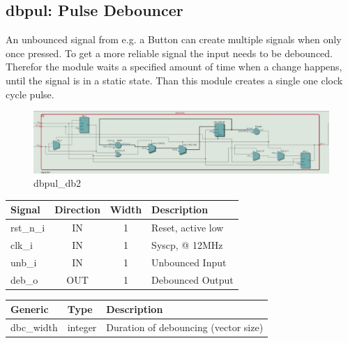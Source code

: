 \documentclass[12pt,a4 paper] {report}
\begin{document}
\newpage

\subsection{dbpul: Pulse Debouncer}
An unbounced signal from e.g. a Button can create multiple signals when only once pressed. To get a more reliable signal 
the input needs to be debounced. Therefor the module waits a specified amount of time when a change happens, until the 
signal is in a static state. Than this module creates a single one clock cycle pulse.
\begin{figure}[h]
	\centering	
	\includegraphics[scale=0.3]{../png/dbpul_db2.png}
	\caption{dbpul\_db2}
\end{figure}
\begin{center}
	\begin{tabular}{ | p{2cm} | c | c | p{5cm} |}
		\hline
		\textbf{Signal} & \textbf{Direction} & \textbf{Width} & \textbf{Description} \\
		\hline	
  	rst\_n\_i & IN & 1 &  Reset, active low \\
  	\hline
		clk\_i & IN & 1 & Syscp, @ 12MHz \\
		\hline
		unb\_i & IN & 1 & Unbounced Input \\
		\hline
		deb\_o & OUT & 1 & Debounced Output \\
		\hline
	\end{tabular}
\end{center}
\begin{center}
	\begin{tabular}{| p{2cm} | p{2cm} | p{4cm} |}
	\hline
	\textbf{Generic} & \textbf{Type} & \textbf{Description} \\
	\hline
	dbc\_width & integer & Duration of debouncing (vector size) \\
	\hline
	\end{tabular}
\end{center}

\newpage
\end{document}
